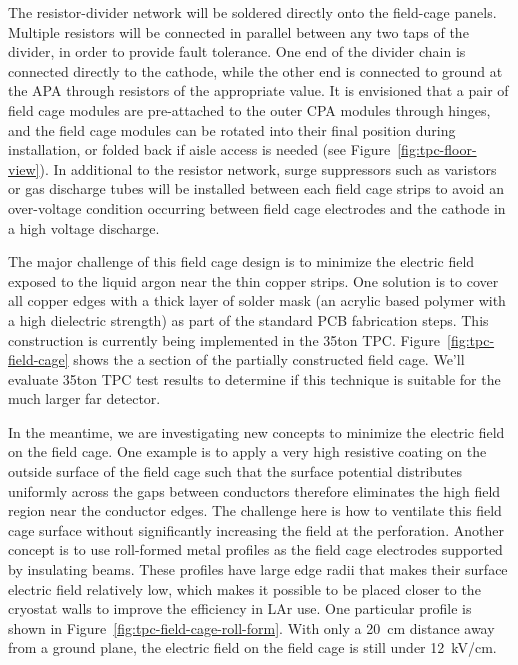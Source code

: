 The resistor-divider network will be soldered directly onto the field-cage panels. Multiple resistors will be connected in parallel between any two taps of the divider,
in order to provide fault tolerance. One end of the divider chain is connected directly to the cathode, while the other end is connected to ground at the APA through resistors of the appropriate value.  It is envisioned that a pair of field cage modules are pre-attached to the outer CPA modules through hinges, and the field cage modules can be rotated into their final position during installation, or folded back if aisle access is needed (see Figure~\ref{fig:tpc-floor-view}). 
In additional to the resistor network, surge suppressors such as varistors or gas discharge tubes will be installed between each field cage strips to avoid an over-voltage condition occurring between field cage electrodes and the cathode in a high voltage discharge.


The major challenge of this field cage design is to minimize the electric field exposed to the liquid argon near the thin copper strips.  One solution is to cover all copper edges with a thick layer of solder mask (an acrylic based polymer with a high dielectric strength) as part of the standard PCB fabrication steps.  This construction is currently being implemented in the 35ton TPC.  Figure~\ref{fig:tpc-field-cage} shows 
the a section of the partially constructed field cage.  We'll evaluate 35ton TPC test results to determine if this technique is suitable for the much larger far detector. 
 
In the meantime, we are investigating new concepts to minimize the electric field on the field cage.  One example is to apply a very high resistive coating on the outside surface of the field cage such that the surface potential distributes uniformly across the gaps between conductors therefore eliminates the high field region near the conductor edges.  The challenge here is how to ventilate this field cage surface without significantly increasing the field at the perforation.  Another concept is to use roll-formed metal profiles as the field cage electrodes supported by insulating beams.  These profiles have large edge radii that makes their surface electric field relatively low, which makes it possible to be placed closer to the cryostat walls to improve the efficiency in LAr use.  One particular profile is shown in Figure~\ref{fig:tpc-field-cage-roll-form}.  With only a 20~cm distance away from a ground plane, the electric field on the field cage is still under 12~kV/cm.

